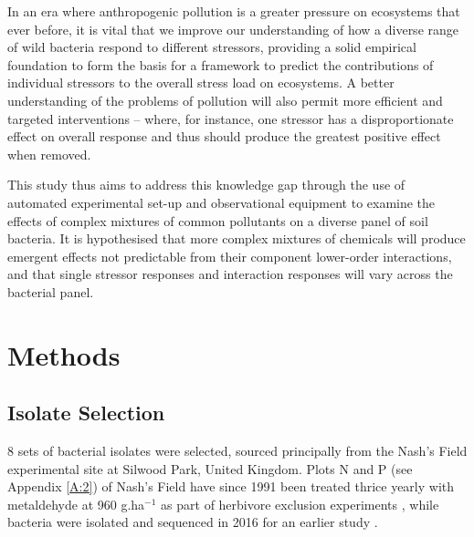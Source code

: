 \documentclass[review,12pt]{elsarticle}
\begin{document}
In an era where anthropogenic pollution is a greater pressure on ecosystems that ever before, it is vital that we improve our understanding of how a diverse range of wild bacteria respond to different stressors, providing a solid empirical foundation to form the basis for a framework to predict the contributions of individual stressors to the overall stress load on ecosystems. A better understanding of the problems of pollution will also permit more efficient and targeted interventions – where, for instance, one stressor has a disproportionate effect on overall response and thus should produce the greatest positive effect when removed. 

This study thus aims to address this knowledge gap through the use of automated experimental set-up and observational equipment to examine the effects of complex mixtures of common pollutants on a diverse panel of soil bacteria. It is hypothesised that more complex mixtures of chemicals will produce emergent effects not predictable from their component lower-order interactions, and that single stressor responses and interaction responses will vary across the bacterial panel.

\section{Methods}
\label{S:2}
\subsection{Isolate Selection}
\label{S:2:1}

8 sets of bacterial isolates  were selected, sourced principally from the Nash's Field experimental site at Silwood Park, United Kingdom. Plots N and P (see Appendix \ref{A:2}) of Nash's Field have since 1991 been treated thrice yearly with metaldehyde at 960 g.ha$^{-1}$ as part of herbivore exclusion experiments \cite{Allan2011ContrastingExperiment}, while bacteria were isolated and sequenced in 2016 for an earlier study \cite{Mombrikotb2016}. 
\end{document}
